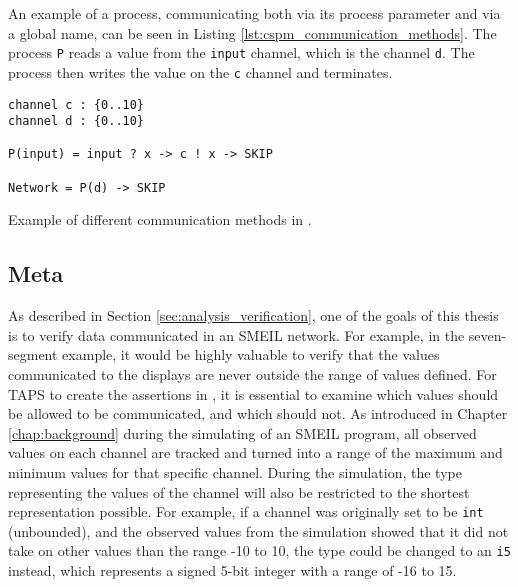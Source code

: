 An example of a \cspm{} process, communicating both via its process parameter and via a global name, can be seen in Listing \ref{lst:cspm_communication_methods}. The process \texttt{P} reads a value from the \texttt{input} channel, which is the channel \texttt{d}. The process then writes the value on the \texttt{c} channel and terminates.
\begin{listing}
\begin{verbatim}
channel c : {0..10}
channel d : {0..10}

P(input) = input ? x -> c ! x -> SKIP

Network = P(d) -> SKIP
\end{verbatim}
\caption{Example of different communication methods in \cspm{}.}
\label{lst:cspm_communication_methods}
\end{listing}
\subsection{Meta}
As described in Section \ref{sec:analysis_verification}, one of the goals of this thesis is to verify data communicated in an SMEIL network. For example, in the seven-segment example, it would be highly valuable to verify that the values communicated to the displays are never outside the range of values defined. For TAPS to create the assertions in \cspm{}, it is essential to examine which values should be allowed to be communicated, and which should not.
As introduced in Chapter \ref{chap:background} during the simulating of an SMEIL program, all observed values on each channel are tracked and turned into a range of the maximum and minimum values for that specific channel. During the simulation, the type representing the values of the channel will also be restricted to the shortest representation possible. For example, if a channel was originally set to be \texttt{int} (unbounded), and the observed values from the simulation showed that it did not take on other values than the range -10 to 10, the type could be changed to an \texttt{i5} instead, which represents a signed 5-bit integer with a range of -16 to 15.


